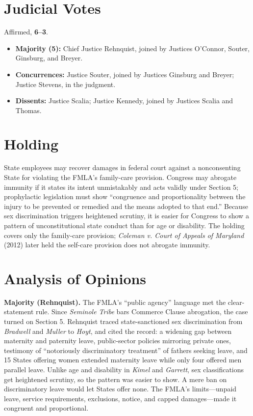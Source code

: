 \documentclass[12pt]{article}
\begin{document}
\section{Judicial Votes}

Affirmed, \textbf{6--3}.
\begin{itemize}
\item \textbf{Majority (5):} Chief Justice Rehnquist, joined by Justices O'Connor, Souter, Ginsburg, and Breyer.
\item \textbf{Concurrences:} Justice Souter, joined by Justices Ginsburg and Breyer; Justice Stevens, in the judgment.
\item \textbf{Dissents:} Justice Scalia; Justice Kennedy, joined by Justices Scalia and Thomas.
\end{itemize}

\section{Holding}

State employees may recover damages in federal court against a nonconsenting State for violating the FMLA's family-care provision. Congress may abrogate immunity if it states its intent unmistakably and acts validly under Section 5; prophylactic legislation must show ``congruence and proportionality between the injury to be prevented or remedied and the means adopted to that end.'' Because sex discrimination triggers heightened scrutiny, it is easier for Congress to show a pattern of unconstitutional state conduct than for age or disability. The holding covers only the family-care provision; \textit{Coleman v. Court of Appeals of Maryland} (2012) later held the self-care provision does not abrogate immunity.

\section{Analysis of Opinions}

\textbf{Majority (Rehnquist).} The FMLA's ``public agency'' language met the clear-statement rule. Since \textit{Seminole Tribe} bars Commerce Clause abrogation, the case turned on Section 5. Rehnquist traced state-sanctioned sex discrimination from \textit{Bradwell} and \textit{Muller} to \textit{Hoyt}, and cited the record: a widening gap between maternity and paternity leave, public-sector policies mirroring private ones, testimony of ``notoriously discriminatory treatment'' of fathers seeking leave, and 15 States offering women extended maternity leave while only four offered men parallel leave. Unlike age and disability in \textit{Kimel} and \textit{Garrett}, sex classifications get heightened scrutiny, so the pattern was easier to show. A mere ban on discriminatory leave would let States offer none. The FMLA's limits---unpaid leave, service requirements, exclusions, notice, and capped damages---made it congruent and proportional.
\end{document}
